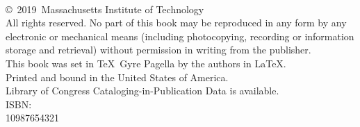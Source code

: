 \thispagestyle{empty}
\begin{fullwidth}
\vfill
\noindent\\[3in]
\copyright\ 2019\ Massachusetts Institute of
Technology\\[0.2in]
All rights reserved. No part of this book may be reproduced in any
form by any electronic or mechanical means (including photocopying,
recording or information storage and retrieval)
without permission in writing from the publisher.\\[0.2in]
This book was set in \TeX\ Gyre Pagella by the authors in \LaTeX.\\
Printed and bound in the United States of America.\\[0.2in]
Library of Congress Cataloging-in-Publication Data is available.\\[0.2in]
ISBN: \\[0.2in]
 10\hspace{1em}9\hspace{1em}8\hspace{1em}7\hspace{1em}6\hspace{1em}5\hspace{1em}4\hspace{1em}3\hspace{1em}2\hspace{1em}1
\end{fullwidth}

\clearpage
